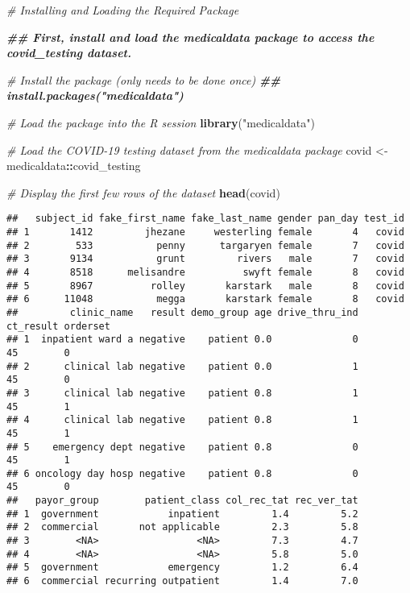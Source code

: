 \documentclass[
]{book}
\newenvironment{Shaded}{\begin{snugshade}}{\end{snugshade}}
\newcommand{\CommentTok}[1]{\textcolor[rgb]{0.56,0.35,0.01}{\textit{#1}}}
\newcommand{\DocumentationTok}[1]{\textcolor[rgb]{0.56,0.35,0.01}{\textbf{\textit{#1}}}}
\newcommand{\FunctionTok}[1]{\textcolor[rgb]{0.13,0.29,0.53}{\textbf{#1}}}
\newcommand{\NormalTok}[1]{#1}
\newcommand{\OtherTok}[1]{\textcolor[rgb]{0.56,0.35,0.01}{#1}}
\newcommand{\SpecialCharTok}[1]{\textcolor[rgb]{0.81,0.36,0.00}{\textbf{#1}}}
\newcommand{\StringTok}[1]{\textcolor[rgb]{0.31,0.60,0.02}{#1}}
\begin{document}
\begin{Shaded}
\begin{Highlighting}[]
\CommentTok{\# Installing and Loading the Required Package}

\DocumentationTok{\#\# First, install and load the \textasciigrave{}medicaldata\textasciigrave{} package to access the \textasciigrave{}covid\_testing\textasciigrave{} dataset.}


\CommentTok{\# Install the package (only needs to be done once)}
\DocumentationTok{\#\# install.packages("medicaldata")}

\CommentTok{\# Load the package into the R session}
\FunctionTok{library}\NormalTok{(}\StringTok{"medicaldata"}\NormalTok{)}

\CommentTok{\# Load the COVID{-}19 testing dataset from the medicaldata package}
\NormalTok{covid }\OtherTok{\textless{}{-}}\NormalTok{ medicaldata}\SpecialCharTok{::}\NormalTok{covid\_testing}

\CommentTok{\# Display the first few rows of the dataset}
\FunctionTok{head}\NormalTok{(covid)}
\end{Highlighting}
\end{Shaded}

\begin{verbatim}
##   subject_id fake_first_name fake_last_name gender pan_day test_id
## 1       1412         jhezane     westerling female       4   covid
## 2        533           penny      targaryen female       7   covid
## 3       9134           grunt         rivers   male       7   covid
## 4       8518      melisandre          swyft female       8   covid
## 5       8967          rolley       karstark   male       8   covid
## 6      11048           megga       karstark female       8   covid
##         clinic_name   result demo_group age drive_thru_ind ct_result orderset
## 1  inpatient ward a negative    patient 0.0              0        45        0
## 2      clinical lab negative    patient 0.0              1        45        0
## 3      clinical lab negative    patient 0.8              1        45        1
## 4      clinical lab negative    patient 0.8              1        45        1
## 5    emergency dept negative    patient 0.8              0        45        1
## 6 oncology day hosp negative    patient 0.8              0        45        0
##   payor_group        patient_class col_rec_tat rec_ver_tat
## 1  government            inpatient         1.4         5.2
## 2  commercial       not applicable         2.3         5.8
## 3        <NA>                 <NA>         7.3         4.7
## 4        <NA>                 <NA>         5.8         5.0
## 5  government            emergency         1.2         6.4
## 6  commercial recurring outpatient         1.4         7.0
\end{verbatim}
\end{document}
